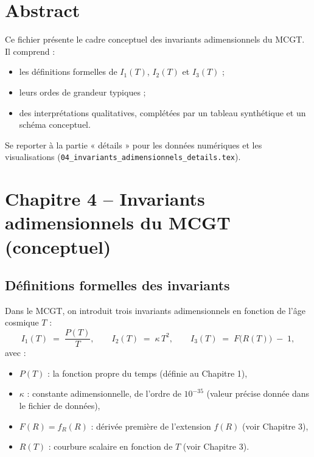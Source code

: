 \section*{Abstract}
Ce fichier présente le cadre conceptuel des invariants adimensionnels du MCGT. Il comprend :
\begin{itemize}
  \item les définitions formelles de $I_{1}(T)$, $I_{2}(T)$ et $I_{3}(T)$ ;
  \item leurs ordes de grandeur typiques ;
  \item des interprétations qualitatives, complétées par un tableau synthétique et un schéma conceptuel.
\end{itemize}
Se reporter à la partie « détails » pour les données numériques et les visualisations (\texttt{04\_invariants\_adimensionnels\_details.tex}).

\bigskip
\section{Chapitre 4 – Invariants adimensionnels du MCGT (conceptuel)}

\subsection{Définitions formelles des invariants}
Dans le MCGT, on introduit trois invariants adimensionnels en fonction de l’âge cosmique $T$ :
\[
  I_{1}(T) \;=\; \frac{P(T)}{T},
  \qquad
  I_{2}(T) \;=\; \kappa\,T^{2},
  \qquad
  I_{3}(T) \;=\; F\bigl(R(T)\bigr)\;-\;1,
\]
avec :
\begin{itemize}
  \item $P(T)$ : la fonction propre du temps (définie au Chapitre 1),
  \item $\kappa$ : constante adimensionnelle, de l’ordre de $10^{-35}$ (valeur précise donnée dans le fichier de données),
  \item $F(R) = f_{R}(R)$ : dérivée première de l’extension $f(R)$ (voir Chapitre 3),
  \item $R(T)$ : courbure scalaire en fonction de $T$ (voir Chapitre 3).
\end{itemize}

